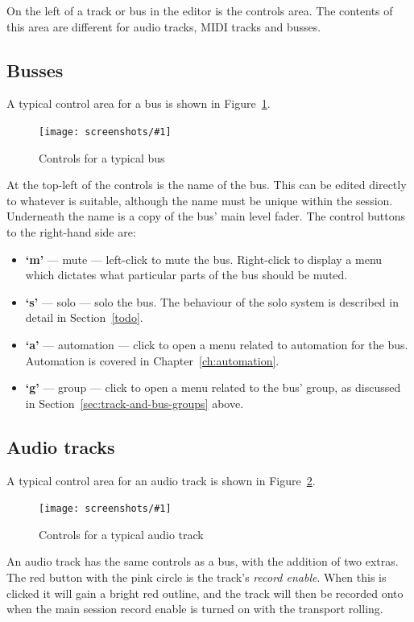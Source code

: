 \documentclass[10pt,a4paper]{book}
\newcommand{\todo}[1]{\marginpar{\small\texttt{#1}}}
\newcommand{\screenshot}[3]{%
\begin{figure}[ht]%
\begin{center}
\texttt{[image: screenshots/\#1]}
\end{center}
\caption{#2}
\label{#3}
\end{figure}}
\begin{document}
{On the left of a track or bus in the editor is the controls area.  The
contents of this area are different for audio tracks, MIDI tracks and busses.

\subsection{Busses}

A typical control area for a bus is shown in
Figure~\ref{fig:typical-bus-controls}.

\screenshot{typical-bus-controls.png}{Controls for a typical bus}{fig:typical-bus-controls}

At the top-left of the controls is the name of the bus.  This can be
edited directly to whatever is suitable, although the name must be
unique within the session.  Underneath the name is a copy of the bus'
main level fader.  The control buttons to the right-hand side are:

\begin{itemize}
\item \textbf{`m'} --- mute --- left-click to mute the bus.
  Right-click to display a menu which dictates what particular parts
  of the bus should be muted. \todo{detail of muting options}
\item \textbf{`s'} --- solo --- solo the bus.  The behaviour of the
  solo system is described in detail in Section~\ref{todo}.
\item \textbf{`a'} --- automation --- click to open a menu related to
  automation for the bus.  Automation is covered in Chapter~\ref{ch:automation}.
\item \textbf{`g'} --- group --- click to open a menu related to the
  bus' group, as discussed in Section~\ref{sec:track-and-bus-groups} above.
\end{itemize}


\subsection{Audio tracks}

A typical control area for an audio track is shown in Figure~\ref{fig:typical-audio-track-controls}.

\screenshot{typical-audio-track-controls.png}{Controls for a typical audio track}{fig:typical-audio-track-controls}

An audio track has the same controls as a bus, with the addition of
two extras.  The red button with the pink circle is the track's
\emph{record enable}.  When this is clicked it will gain a bright red
outline, and the track will then be recorded onto when the main
session record enable is turned on with the transport rolling.

}
\end{document}

